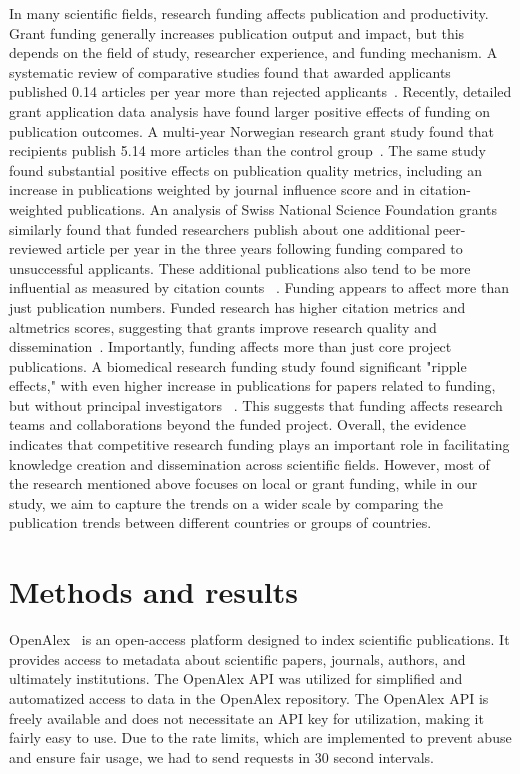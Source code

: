 \documentclass[amsfonts, amssymb, prl, superscriptaddress, notitlepage, twocolumn, nofootinbib]{revtex4-2}
\begin{document}
In many scientific fields, research funding affects publication and productivity. Grant funding generally increases publication output and impact, but this depends on the field of study, researcher experience, and funding mechanism. A systematic review of comparative studies found that awarded applicants published 0.14 articles per year more than rejected applicants~\cite{saygitov2018impact}. Recently, detailed grant application data analysis have found larger positive effects of funding on publication outcomes. A multi-year Norwegian research grant study found that recipients publish 5.14 more articles than the control group~\cite{adda2023impact}. The same study found substantial positive effects on publication quality metrics, including an increase in publications weighted by journal influence score and in citation-weighted publications. An analysis of Swiss National Science Foundation grants similarly found that funded researchers publish about one additional peer-reviewed article per year in the three years following funding compared to unsuccessful applicants. These additional publications also tend to be more influential as measured by citation counts ~\cite{ heyard2021value}. Funding appears to affect more than just publication numbers. Funded research has higher citation metrics and altmetrics scores, suggesting that grants improve research quality and dissemination~\cite{heyard2021value}. Importantly, funding affects more than just core project publications. A biomedical research funding study found significant "ripple effects," with even higher increase in publications for papers related to funding, but without principal investigators ~\cite{sattari2022ripple}. This suggests that funding affects research teams and collaborations beyond the funded project. Overall, the evidence indicates that competitive research funding plays an important role in facilitating knowledge creation and dissemination across scientific fields. However, most of the research mentioned above focuses on local or grant funding, while in our study, we aim to capture the trends on a wider scale by comparing the publication trends between different countries or groups of countries.

\section{Methods and results}
OpenAlex~\cite{priem2022openalex} is an open-access platform designed to index scientific publications. It provides access to metadata about scientific papers, journals, authors, and ultimately institutions. The OpenAlex API was utilized for simplified and automatized access to data in the OpenAlex repository. The OpenAlex API is freely available and does not necessitate an API key for utilization, making it fairly easy to use. Due to the rate limits, which are implemented to prevent abuse and ensure fair usage, we had to send requests in 30 second intervals. 
\end{document}
